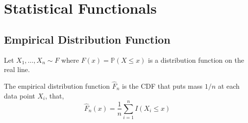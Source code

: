 \chapter{Statistical Functionals}

\section{Empirical Distribution Function}

Let $X_{1},\ldots,X_{n}\sim F$ where $F(x)=\mathbb{P}(X\leq x)$ is a distribution function on the real line.

\begin{definition}
    The empirical distribution function $\widehat{F}_{n}$ is the CDF that puts mass $1/n$ at each data point $X_{i}$, that,
    \begin{equation}
        \widehat{F}_{n}(x)=\frac{1}{n}\sum_{i=1}^{n}I\left(X_{i}\leq x\right)
    \end{equation}
\end{definition}

